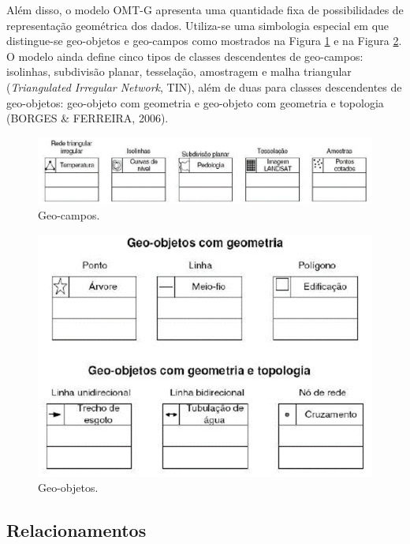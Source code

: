 		Além disso, o modelo OMT-G apresenta uma quantidade fixa de possibilidades de representação geométrica dos dados. Utiliza-se uma simbologia especial em que distingue-se geo-objetos e geo-campos como mostrados na Figura \ref{fig:geocampos} e na Figura \ref{fig:geoobjetos}. O modelo ainda define cinco tipos de classes descendentes de geo-campos: isolinhas, subdivisão planar, tesselação, amostragem e malha triangular (\textit{Triangulated Irregular Network}, TIN), além de duas para classes descendentes de geo-objetos: geo-objeto com geometria e geo-objeto com geometria e topologia (BORGES \& FERREIRA, 2006). 
		
		\begin{figure} [h]
			\centering
			\includegraphics[width=1\linewidth]{data/geocampos}
			\caption{Geo-campos.\cite{BORGES_etal05}}
			\label{fig:geocampos}
		\end{figure}
	
		\begin{figure}[h]
			\centering
			\includegraphics[width=0.9\linewidth]{data/geoobjetos}
			\caption{Geo-objetos.\cite{BORGES_etal05}}
			\label{fig:geoobjetos}
		\end{figure}
		
		\subsection{Relacionamentos}
		
